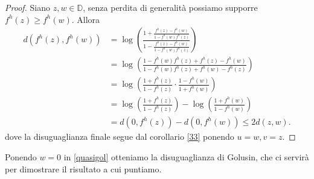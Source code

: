 \begin{proof}
  Siano $z, w \in \mathbb{D}$, senza perdita di generalità possiamo supporre $f^h(z) \ge f^h(w)$. Allora
  \begin{align*}
    d(f^h(z), f^h(w)) & =\log\left(\frac{1+\frac{f^h(z)-f^h(w)}{1-f^h(w)f^h(z)}}{1-\frac{f^h(z)-f^h(w)}{1-f^h(w)f^h(z)}}\right) \\
    & =\log\left(\frac{1-f^h(w)f^h(z)+f^h(z)-f^h(w)}{1-f^h(w)f^h(z)+f^h(w)-f^h(z)}\right) \\
    & =\log\left(\frac{1+f^h(z)}{1-f^h(z)}\cdot\frac{1-f^h(w)}{1+f^h(w)}\right) \\
    & =\log\left(\frac{1+f^h(z)}{1-f^h(z)}\right)-\log\left(\frac{1+f^h(w)}{1-f^h(w)}\right) \\
    & =d(0,f^h(z))-d(0,f^h(w)) \le 2d(z,w).
  \end{align*}
  dove la disuguaglianza finale segue dal corollario \ref{33} ponendo $u=w, v=z$.
\end{proof}

Ponendo $w=0$ in \eqref{quasigol} otteniamo la disuguaglianza di Golusin, che ci servirà per dimostrare il risultato a cui puntiamo.
